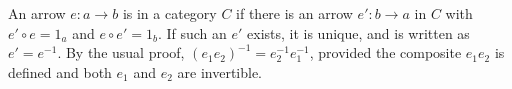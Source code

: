 An arrow $e: a \rightarrow b$ is  in a category $C$ if there is an arrow $e': b \rightarrow a$ in $C$ with $e' \circ e = 1_a$ and $e \circ e' = 1_b$. If such an $e'$ exists, it is unique, and is written as $e' = e^{-1}$. By the usual proof, $(e_1 e_2)^{-1} = e_2^{-1} e_1^{-1}$, provided the composite $e_1 e_2$ is defined and both $e_1$ and $e_2$ are invertible.
